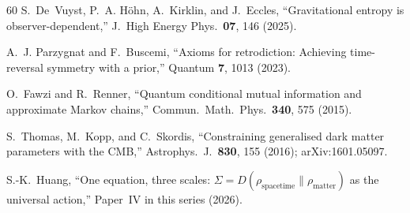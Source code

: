 \documentclass[prd,twocolumn,superscriptaddress,longbibliography,floatfix]{revtex4-2}
\begin{document}
\begin{thebibliography}{60}
S.~De~Vuyst, P.~A. H\"ohn, A.~Kirklin, and J.~Eccles,
``Gravitational entropy is observer-dependent,''
J.\ High Energy Phys.\ \textbf{07}, 146 (2025).

A.~J. Parzygnat and F.~Buscemi,
``Axioms for retrodiction: Achieving time-reversal symmetry
with a prior,''
Quantum \textbf{7}, 1013 (2023).

O.~Fawzi and R.~Renner,
``Quantum conditional mutual information and approximate
Markov chains,''
Commun.\ Math.\ Phys.\ \textbf{340}, 575 (2015).

S.~Thomas, M.~Kopp, and C.~Skordis,
``Constraining generalised dark matter parameters with
the CMB,''
Astrophys.\ J.\ \textbf{830}, 155 (2016);
arXiv:1601.05097.

S.-K.~Huang,
``One equation, three scales:
$\Sigma = D(\rho_{\mathrm{spacetime}} \| \rho_{\mathrm{matter}})$
as the universal action,''
Paper~IV in this series (2026).

\end{thebibliography}
\end{document}
